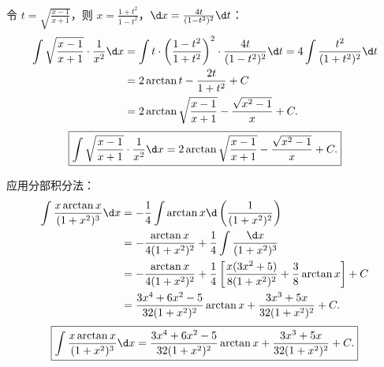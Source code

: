 \begin{solution}
    令 $t = \sqrt{\frac{x - 1}{x + 1}}$，则 $x = \frac{1 + t^2}{1 - t^2}$，$\d x = \frac{4t}{(1 - t^2)^2}\d t$：
    \begin{equation}
        \begin{aligned}
            \int \sqrt{\frac{x - 1}{x + 1}} \cdot \frac{1}{x^2} \d x & = \int t \cdot \left( \frac{1 - t^2}{1 + t^2} \right)^2 \cdot \frac{4t}{(1 - t^2)^2} \d t = 4\int \frac{t^2}{(1 + t^2)^2} \d t \\
                                                                     & = 2\arctan t - \frac{2t}{1 + t^2} + C                                                                                          \\
                                                                     & = 2\arctan\sqrt{\frac{x - 1}{x + 1}} - \frac{\sqrt{x^2 - 1}}{x} + C.
        \end{aligned}
    \end{equation}
    \begin{equation}
        \boxed{\int \sqrt{\frac{x - 1}{x + 1}} \cdot \frac{1}{x^2} \d x = 2\arctan\sqrt{\frac{x - 1}{x + 1}} - \frac{\sqrt{x^2 - 1}}{x} + C.}
    \end{equation}


    应用分部积分法：
    \begin{equation}
        \begin{aligned}
            \int \frac{x \arctan x}{(1 + x^2)^3} \d x & = -\frac{1}{4}\int \arctan x \d\left( \frac{1}{(1 + x^2)^2} \right)                                                       \\
                                                      & = -\frac{\arctan x}{4(1 + x^2)^2} + \frac{1}{4}\int \frac{\d x}{(1 + x^2)^3}                                              \\
                                                      & = -\frac{\arctan x}{4(1 + x^2)^2} + \frac{1}{4}\left[ \frac{x(3x^2 + 5)}{8(1 + x^2)^2} + \frac{3}{8}\arctan x \right] + C \\
                                                      & = \frac{3x^4 + 6x^2 - 5}{32(1 + x^2)^2}\arctan x + \frac{3x^3 + 5x}{32(1 + x^2)^2} + C.
        \end{aligned}
    \end{equation}
    \begin{equation}
        \boxed{\int \frac{x \arctan x}{(1 + x^2)^3} \d x = \frac{3x^4 + 6x^2 - 5}{32(1 + x^2)^2}\arctan x + \frac{3x^3 + 5x}{32(1 + x^2)^2} + C.}
    \end{equation}


\end{solution}

